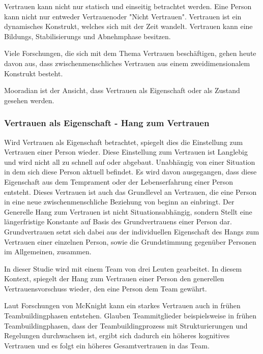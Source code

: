 \documentclass[a4paper,11pt]{article}%
\renewcommand{\\}{\vspace*{0.5\baselineskip} \newline}
\begin{document}
Vertrauen kann nicht nur statisch und einseitig betrachtet werden. Eine Person kann nicht nur entweder \dq Vertrauen\dq oder "Nicht Vertrauen". Vertrauen ist ein dynamisches Konstrukt, welches sich mit der Zeit wandelt. Vertrauen kann eine Bildungs, Stabilisierungs und Abnehmphase besitzen. \citep[p.396]{rousseau1998not}

Viele Forschungen, die sich mit dem Thema Vertrauen beschäftigen, gehen heute davon aus, dass zwischenmenschliches Vertrauen aus einem zweidimensionalem Konstrukt besteht. \citep{johnson2005cognitive} \citep{cook1980new}

Mooradian \citep[p.524-525]{mooradian2006trusts} ist der Ansicht, dass Vertrauen als \dq Eigenschaft\dq{} oder als \dq Zustand\dq{} gesehen werden.

	\subsubsection{Vertrauen als Eigenschaft - Hang zum Vertrauen}

Wird Vertrauen als Eigenschaft betrachtet, spiegelt dies die Einstellung zum Vertrauen einer Person wieder. Diese Einstellung zum Vertrauen ist Langlebig und wird nicht all zu schnell auf oder abgebaut. Unabhängig von einer Situation in dem sich diese Person aktuell befindet. Es wird davon ausgegangen, dass diese Eigenschaft aus dem Temprament oder der Lebenserfahrung einer Person entsteht. Dieses Vertrauen ist auch das Grundlevel an Vertrauen, die eine Person in eine neue zwischenmenschliche Beziehung von beginn an einbringt.\\
Der Generelle Hang zum Vertrauen ist nicht Situationsabhängig, sondern Stellt eine längerfristige Konstante auf Basis des Grundvertrauens einer Person dar.
Grundvertrauen setzt sich dabei aus der individuellen Eigenschaft des Hangs zum Vertrauen einer einzelnen Person, sowie die Grundstimmung gegenüber Personen im Allgemeinen, zusammen. \citep{couch1996assessment} \\

In dieser Studie wird mit einem Team von drei Leuten gearbeitet. In diesem Kontext, spiegelt der Hang zum Vertrauen einer Person den generellen Vertrauensvorschuss wieder, den eine Person dem Team gewährt. 

Laut Forschungen von McKnight kann ein starkes Vertrauen auch in frühen Teambuildingphasen entstehen. Glauben Teammitglieder beispielsweise in frühen Teambuildingphasen, dass der Teambuildingprozess mit Strukturierungen und Regelungen durchwachsen ist, ergibt sich dadurch ein höheres kognitives Vertrauen und es folgt ein höheres Gesamtvertrauen in das Team. \citep[p.478-479]{mcknight1998initial}
\end{document}
